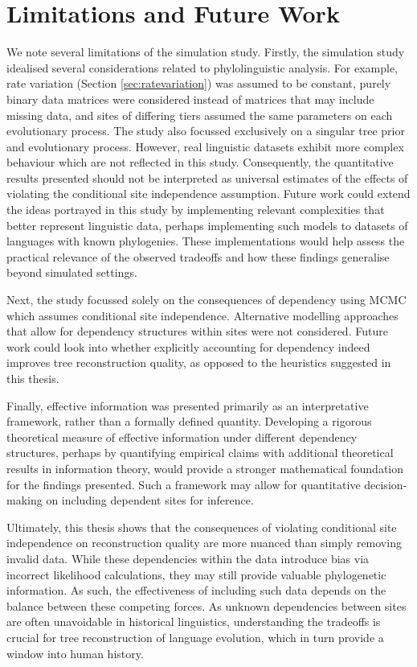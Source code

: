 \section{Limitations and Future Work}
We note several limitations of the simulation study. Firstly, the simulation study idealised several considerations related to phylolinguistic analysis. For example, rate variation (Section \ref{sec:ratevariation}) was assumed to be constant, purely binary data matrices were considered instead of matrices that may include missing data, and sites of differing tiers assumed the same parameters on each evolutionary process. The study also focussed exclusively on a singular tree prior and evolutionary process. However, real linguistic datasets exhibit more complex behaviour which are not reflected in this study. Consequently, the quantitative results presented should not be interpreted as universal estimates of the effects of violating the conditional site independence assumption. Future work could extend the ideas portrayed in this study by implementing relevant complexities that better represent linguistic data, perhaps implementing such models to datasets of languages with known phylogenies. These implementations would help assess the practical relevance of the observed tradeoffs and how these findings generalise beyond simulated settings.

Next, the study focussed solely on the consequences of dependency using MCMC which assumes conditional site independence. Alternative modelling approaches that allow for dependency structures within sites were not considered. Future work could look into whether explicitly accounting for dependency indeed improves tree reconstruction quality, as opposed to the heuristics suggested in this thesis.

Finally, effective information was presented primarily as an interpretative framework, rather than a formally defined quantity. Developing a rigorous theoretical measure of effective information under different dependency structures, perhaps by quantifying empirical claims with additional theoretical results in information theory, would provide a stronger mathematical foundation for the findings presented. Such a framework may allow for quantitative decision-making on including dependent sites for inference.

Ultimately, this thesis shows that the consequences of violating conditional site independence on reconstruction quality are more nuanced than simply removing invalid data. While these dependencies within the data introduce bias via incorrect likelihood calculations, they may still provide valuable phylogenetic information. As such, the effectiveness of including such data depends on the balance between these competing forces. As unknown dependencies between sites are often unavoidable in historical linguistics, understanding the tradeoffs is crucial for tree reconstruction of language evolution, which in turn provide a window into human history.